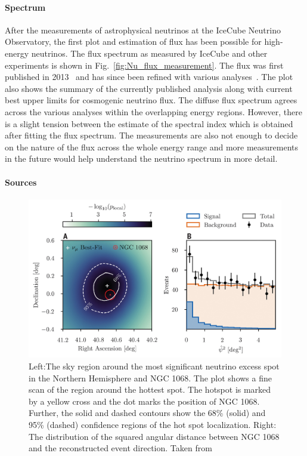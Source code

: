   \paragraph*{Spectrum}
  \label{subsubsec:Nuspectrum}
  After the measurements of astrophysical neutrinos at the IceCube Neutrino Observatory, the first plot and estimation of flux has been possible for high-energy neutrinos. The flux spectrum as measured by IceCube and other experiments is shown in Fig.~\ref{fig:Nu_flux_measurement}. The flux was first published in 2013~\cite{Aartsen_2014_first_flux} and has since been refined with various analyses~\cite{PhysRevD.110.022001}. The plot also shows the summary of the currently published analysis along with current best upper limits for cosmogenic neutrino flux. The diffuse flux spectrum agrees across the various analyses within the overlapping energy regions. However, there is a slight tension between the estimate of the spectral index which is obtained after fitting the flux spectrum. The measurements are also not enough to decide on the nature of the flux across the whole energy range and more measurements in the future would help understand the neutrino spectrum in more detail. 

  \paragraph*{Sources}
  \label{subsubsec:Nusources}
  \begin{figure}[t!]
    \centering
    \includegraphics[width=14.5cm]{thesis_figures/CRnNu/science-abg3395-f2.jpg}
    \caption{Left:The sky region around the most significant neutrino excess spot in the Northern Hemisphere and NGC 1068. The plot shows a fine scan of the region around the hottest spot. The hotspot is marked by a yellow cross and the dot marks the position of NGC 1068. Further, 
    the solid and dashed contours show the 68\% (solid) and 95\% (dashed) confidence regions of
    the hot spot localization. Right: The distribution of the squared angular distance between NGC 1068 and the reconstructed event direction. Taken from~\cite{Icecube_2022}}
    \label{fig:NGC1068_excess}
  \end{figure}

